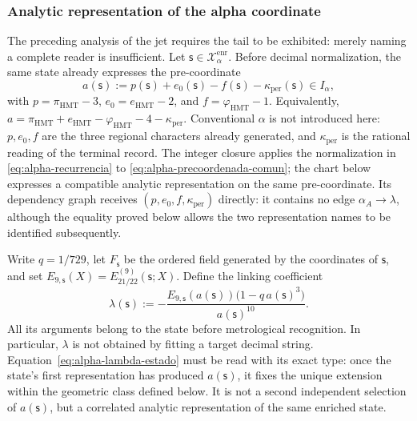 \subsubsection{Analytic representation of the alpha coordinate}
\label{subsec:alpha-lector-completo-rev08}

The preceding analysis of the jet requires the tail to be exhibited:
merely naming a complete reader is insufficient. Let \(\mathsf s\in\mathcal X_\alpha^{\mathrm{enr}}\). Before
decimal normalization, the same state already expresses the pre-coordinate
\begin{equation}
 a(\mathsf s):=p(\mathsf s)+e_0(\mathsf s)-f(\mathsf s)
                 -\kappa_{\mathrm{per}}(\mathsf s)\in I_\alpha,
 \label{eq:alpha-precoordenada-comun}
\end{equation}
with \(p=\pi_{\mathrm{HMT}}-3\),
\(e_0=e_{\mathrm{HMT}}-2\), and
\(f=\varphi_{\mathrm{HMT}}-1\). Equivalently,
\(a=\pi_{\mathrm{HMT}}+e_{\mathrm{HMT}}-
\varphi_{\mathrm{HMT}}-4-\kappa_{\mathrm{per}}\). Conventional
\(\alpha\) is not introduced here: \(p,e_0,f\) are the three regional
characters already generated, and \(\kappa_{\mathrm{per}}\) is the rational reading
of the terminal record. The integer closure applies the normalization in
\eqref{eq:alpha-recurrencia} to
\eqref{eq:alpha-precoordenada-comun}; the chart below expresses a compatible
analytic representation on the same pre-coordinate. Its dependency graph
receives \((p,e_0,f,\kappa_{\mathrm{per}})\) directly: it contains no
edge \(\alpha_A\to\lambda\), although the equality proved below allows
the two representation names to be identified subsequently.

Write \(q=1/729\), let \(F_{\mathsf s}\) be the ordered field generated by
the coordinates of \(\mathsf s\), and set
\(E_{9,\mathsf s}(X)=E_{21/22}^{(9)}(\mathsf s;X)\). Define the linking
coefficient
\begin{equation}
 \lambda(\mathsf s):=
 -\frac{E_{9,\mathsf s}(a(\mathsf s))
         \bigl(1-q\,a(\mathsf s)^3\bigr)}{a(\mathsf s)^{10}}.
 \label{eq:alpha-lambda-estado}
\end{equation}
All its arguments belong to the state before metrological recognition.
In particular, \(\lambda\) is not obtained by fitting a target decimal
string. Equation~\eqref{eq:alpha-lambda-estado} must be read with
its exact type: once the state's first representation has produced
\(a(\mathsf s)\), it fixes the unique extension within the geometric class
defined below. It is not a second independent selection of
\(a(\mathsf s)\), but a correlated analytic representation of the same
enriched state.

